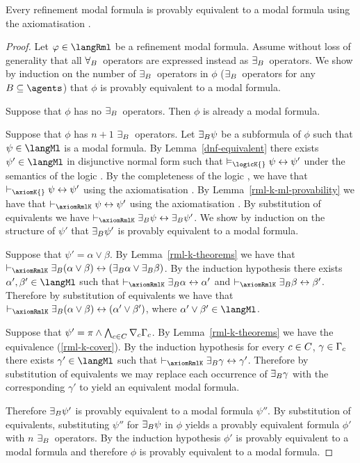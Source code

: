 \begin{lemma}\label{rml-k-ml-equivalent}
Every refinement modal formula is provably equivalent to a modal formula using the axiomatisation \axiomRmlK{}.
\end{lemma}

\begin{proof}
Let $\phi \in \langRml$ be a refinement modal formula.
Assume without loss of generality that all ${\forall_{B}}$~operators are expressed instead as ${\exists_{B}}$~operators.
We show by induction on the number of ${\exists_{B}}$~operators in $\phi$ (${\exists_{B}}$~operators for any $\agentsB \subseteq \agents$) that $\phi$ is provably equivalent to a modal formula.

Suppose that $\phi$ has no ${\exists_{B}}$~operators.
Then $\phi$ is already a modal formula.

Suppose that $\phi$ has $n + 1$ ${\exists_{B}}$~operators.
Let ${\exists_{B}} \psi$ be a subformula of $\phi$ such that $\psi \in \langMl$ is a modal formula.
By Lemma~\ref{dnf-equivalent} there exists $\psi' \in \langMl$ in disjunctive normal form such that $\entails_\logicK{} \psi \iff \psi'$ under the semantics of the logic \logicK{}.
By the completeness of the logic \logicK{}, we have that $\proves_\axiomK{} \psi \iff \psi'$ using the axiomatisation \axiomK{}.
By Lemma~\ref{rml-k-ml-provability} we have that $\proves_\axiomRmlK \psi \iff \psi'$ using the axiomatisation \axiomRmlK{}.
By substitution of equivalents we have $\proves_\axiomRmlK \somerefsBs \psi \iff \somerefsBs \psi'$.
We show by induction on the structure of $\psi'$ that ${\exists_{B}} \psi'$ is provably equivalent to a modal formula.

Suppose that $\psi' = \alpha \lor \beta$.
By Lemma~\ref{rml-k-theorems} we have that $\proves_\axiomRmlK \somerefsBs (\alpha \lor \beta) \iff (\somerefsBs \alpha \lor \somerefsBs \beta)$.
By the induction hypothesis there exists $\alpha', \beta' \in \langMl$ such that $\proves_\axiomRmlK \somerefsBs \alpha \iff \alpha'$ and $\proves_\axiomRmlK \somerefsBs \beta \iff \beta'$.
Therefore by substitution of equivalents we have that $\proves_\axiomRmlK \somerefsBs (\alpha \lor \beta) \iff (\alpha' \lor \beta')$, where $\alpha' \lor \beta' \in \langMl$.

Suppose that $\psi' = \pi \land \bigwedge_{c \in C} \nabla_{c} \Gamma_c$.
By Lemma~\ref{rml-k-theorems} we have the equivalence (\ref{rml-k-cover}).
By the induction hypothesis for every $c \in C$, $\gamma \in \Gamma_c$ there exists $\gamma' \in \langMl$ such that $\proves_\axiomRmlK \somerefsBs \gamma \iff \gamma'$.
Therefore by substitution of equivalents we may replace each occurrence of ${\exists_{B}} \gamma$ with the corresponding $\gamma'$ to yield an equivalent modal formula. 

Therefore ${\exists_{B}} \psi'$ is provably equivalent to a modal formula $\psi''$.
By substitution of equivalents, substituting $\psi''$ for ${\exists_{B}} \psi$ in $\phi$ yields a provably equivalent formula $\phi'$ with $n$ ${\exists_{B}}$~operators.
By the induction hypothesis $\phi'$ is provably equivalent to a modal formula and therefore $\phi$ is provably equivalent to a modal formula.
\end{proof}

